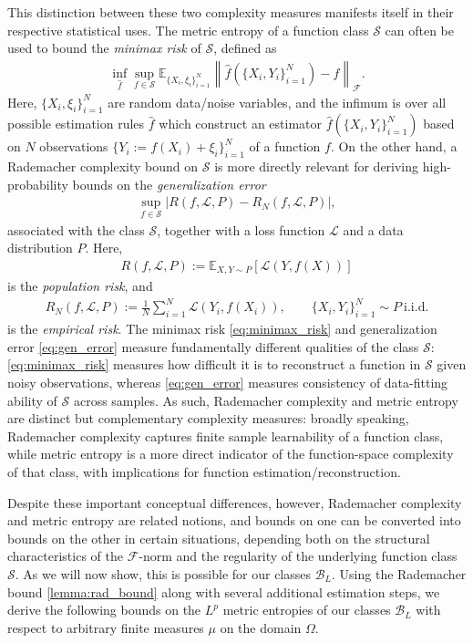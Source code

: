 \documentclass{article}
\def\cB{{\mathcal{B}}}
\def\cF{{\mathcal{F}}}
\def\cL{{\mathcal{L}}}
\def\cS{{\mathcal{S}}}
\def\bE{{\mathbb{E}}}
\begin{document}
This distinction between these two complexity measures manifests itself in their respective statistical uses. The metric entropy of a function class $\cS$ can often be used to bound the \textit{minimax risk} of $\cS$, defined as
\begin{align} \label{eq:minimax_risk}
    \inf_{\hat{f}} \sup_{f \in \cS} \bE_{\{ X_i, \xi_i \}_{i=1}^N} \left\| \hat{f} \left(\{ X_i, Y_i \}_{i=1}^N \right) - f \right\|_{\cF}.
\end{align}
Here, $\{ X_i, \xi_i \}_{i=1}^N$ are random data/noise variables, and the infimum is over all possible estimation rules $\hat{f}$ which construct an estimator $\hat{f} \left(\{ X_i, Y_i \}_{i=1}^N\right)$ based on $N$ observations $\{ Y_i := f(X_i) + \xi_i \}_{i=1}^N$ of a function $f$. On the other hand, a Rademacher complexity bound on $\cS$ is more directly relevant for deriving high-probability bounds on the \textit{generalization error} 
\begin{align} \label{eq:gen_error}
    \sup_{f \in \cS} \left| R(f,\cL, P) - R_N(f, \cL, P) \right|,
\end{align}
associated with the class $\cS$, together with a loss function $\cL$ and a data distribution $P$. Here,
\begin{align}
    R(f, \cL, P) := \bE_{X,Y \sim P} \left[ \cL \left(Y, f(X)  \right) \right] 
\end{align}
is the \textit{population risk}, and 
\begin{align}
    R_N(f, \cL, P) := \frac{1}{N} \sum_{i=1}^N \cL \left( Y_i, f(X_i) \right), \qquad \{ X_i, Y_i \}_{i=1}^N \sim P \ \mathrm{i.i.d.}
\end{align}
is the \textit{empirical risk}. The minimax risk \eqref{eq:minimax_risk} and generalization error \eqref{eq:gen_error} measure fundamentally different qualities of the class $\cS$: \eqref{eq:minimax_risk} measures how difficult it is to reconstruct a function in $\cS$ given noisy observations, whereas \eqref{eq:gen_error} measures consistency of data-fitting ability of $\cS$ across samples. As such, Rademacher complexity and metric entropy are distinct but complementary complexity measures: broadly speaking, Rademacher complexity captures finite sample learnability of a function class, while metric entropy is a more direct indicator of the function-space complexity of that class, with implications for function estimation/reconstruction. 

Despite these important conceptual differences, however, Rademacher complexity and metric entropy are related notions, and bounds on one can be converted into bounds on the other in certain situations, depending both on the structural characteristics of the $\cF$-norm and the regularity of the underlying function class $\cS$. As we will now show, this is possible for our classes $\cB_L$. Using the Rademacher bound \cref{lemma:rad_bound} along with several additional estimation steps, we derive the following bounds on the $L^p$ metric entropies of our classes $\cB_L$ with respect to arbitrary finite measures $\mu$ on the domain $\Omega$.
 
\end{document}
